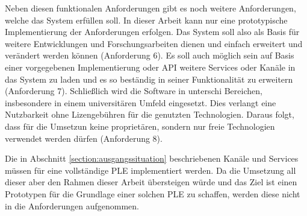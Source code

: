 Neben diesen funktionalen Anforderungen gibt es noch weitere Anforderungen, welche das System erfüllen soll. In dieser Arbeit kann nur eine prototypische Implementierung der Anforderungen erfolgen. Das System soll also als Basis für weitere Entwicklungen und Forschungsarbeiten dienen und einfach erweitert und verändert werden können (Anforderung 6). Es soll auch möglich sein auf Basis einer vorgegebenen Implementierung oder API weitere Services oder Kanäle in das System zu laden und es so beständig in seiner Funktionalität zu erweitern (Anforderung 7). Schließlich wird die Software in unterschi Bereichen, insbesondere in einem universitären Umfeld eingesetzt. Dies verlangt eine Nutzbarkeit ohne Lizengebühren für die genutzten Technologien. Daraus folgt, dass für die Umsetzun keine proprietären, sondern nur freie Technologien verwendet werden dürfen (Anforderung 8). 


Die in Abschnitt \ref{section:ausgangssituation} beschriebenen Kanäle und Services müssen für eine vollständige PLE implementiert werden. Da die Umsetzung all dieser aber den Rahmen dieser Arbeit übersteigen würde und das Ziel ist einen Prototypen für die Grundlage einer solchen PLE zu schaffen, werden diese nicht in die Anforderungen aufgenommen.


